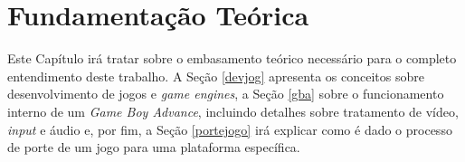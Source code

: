\chapter[Fundamentação Teórica]{Fundamentação Teórica} \label{fundamentacao}

Este Capítulo irá tratar sobre o embasamento teórico necessário para o completo entendimento deste trabalho. A Seção \ref{devjog} apresenta os conceitos sobre desenvolvimento de jogos e \textit{game engines}, a Seção \ref{gba} sobre o funcionamento interno de um \textit{Game Boy Advance}, incluindo detalhes sobre tratamento de vídeo, \textit{input} e áudio e, por fim, a Seção \ref{portejogo} irá explicar como é dado o processo de porte de um jogo para uma plataforma específica.



